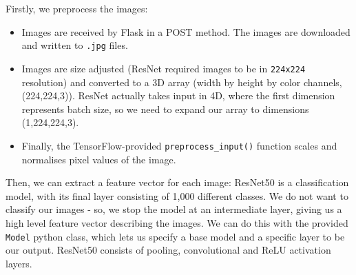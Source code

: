 \documentclass[12pt,a4paper]{article}
\begin{document}
Firstly, we preprocess the images:
\begin{itemize}
    \item Images are received by Flask in a POST method. The images are downloaded and written to \verb|.jpg| files. 
    \item Images are size adjusted (ResNet required images to be in \verb|224x224| resolution) and converted to a 3D array (width by height by color channels, (224,224,3)). ResNet actually takes input in 4D, where the first dimension represents batch size, so we need to expand our array to dimensions (1,224,224,3).
    \item Finally, the TensorFlow-provided \verb|preprocess_input()| function scales and normalises pixel values of the image.
\end{itemize}
Then, we can extract a feature vector for each image: ResNet50 is a classification model, with its final layer consisting of 1,000 different classes. We do not want to classify our images - so, we stop the model at an intermediate layer, giving us a high level feature vector describing the images. We can do this with the provided \verb|Model| python class, which lets us specify a base model and a specific layer to be our output. ResNet50 consists of pooling, convolutional and ReLU activation layers. 
\end{document}
